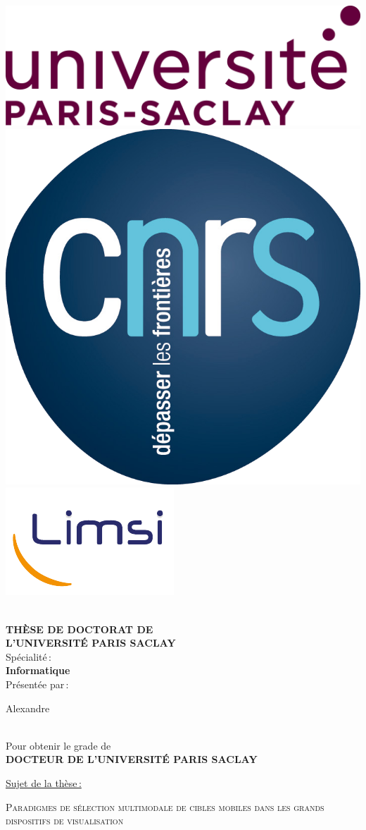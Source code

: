 \begin{titlepage}

\includegraphics[height=2.cm]{./figures/garde/logo_paris_saclay}\hfill
\includegraphics[height=2.cm]{./figures/garde/logo_CNRS}\hfill
\includegraphics[height=2.cm]{./figures/garde/limsilogo_new_transparent_crop}\hfill
\\
\\



\begin{center}
 \textbf{THÈSE DE DOCTORAT DE\\ L'UNIVERSITÉ PARIS SACLAY\\}
Spécialité\,:\\
\textbf{Informatique}\\ 
Présentée par\,:\\ 
\begin{LARGE}
Alexandre\end{LARGE}\\
Pour obtenir le grade de\\
\textbf{DOCTEUR DE L'UNIVERSITÉ PARIS SACLAY}
\end{center}

\noindent \underline{Sujet de la thèse\,: }\\
\begin{center}
\begin{Large}
{\textsc{Paradigmes de sélection multimodale de cibles mobiles dans les grands dispositifs de visualisation}}
\end{Large}
\end{center}


\end{titlepage}
